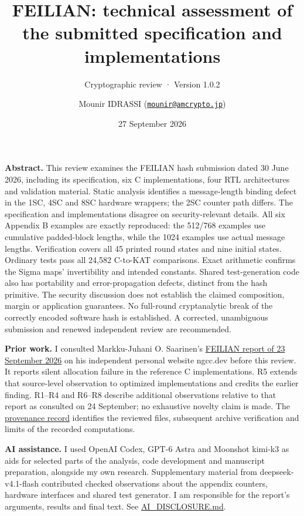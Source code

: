 \documentclass[
  english,
  11pt,
  a4paper,
]{article}
\title{FEILIAN: technical assessment of the submitted specification and
implementations}
\subtitle{Cryptographic review · Version 1.0.2}
\author{Mounir IDRASSI
(\href{mailto:mounir@amcrypto.jp}{\nolinkurl{mounir@amcrypto.jp}})}
\date{27 September 2026}
\begin{document}
\maketitle

\textbf{Abstract.} This review examines the FEILIAN hash submission
dated 30 June 2026, including its specification, six C implementations,
four RTL architectures and validation material. Static analysis
identifies a message-length binding defect in the 1SC, 4SC and 8SC
hardware wrappers; the 2SC counter path differs. The specification and
implementations disagree on security-relevant details. All six Appendix
B examples are exactly reproduced: the 512/768 examples use cumulative
padded-block lengths, while the 1024 examples use actual message
lengths. Verification covers all 45 printed round states and nine
initial states. Ordinary tests pass all 24,582 C-to-KAT comparisons.
Exact arithmetic confirms the Sigma maps' invertibility and intended
constants. Shared test-generation code also has portability and
error-propagation defects, distinct from the hash primitive. The
security discussion does not establish the claimed composition, margin
or application guarantees. No full-round cryptanalytic break of the
correctly encoded software hash is established. A corrected, unambiguous
submission and renewed independent review are recommended.

\textbf{Prior work.} I consulted Markku-Juhani O. Saarinen's
\href{https://ngcc.dev/reports/hash-10.html}{FEILIAN report of 23
September 2026} on his independent personal website ngcc.dev before this
review. It reports silent allocation failure in the reference C
implementations. R5 extends that source-level observation to optimized
implementations and credits the earlier finding. R1--R4 and R6--R8
describe additional observations relative to that report as consulted on
24 September; no exhaustive novelty claim is made. The
\href{PROVENANCE.md}{provenance record} identifies the reviewed files,
subsequent archive verification and limits of the recorded computations.

\textbf{AI assistance.} I used OpenAI Codex, GPT-6 Astra and Moonshot
kimi-k3 as aids for selected parts of the analysis, code development and
manuscript preparation, alongside my own research. Supplementary
material from deepseek-v4.1-flash contributed checked observations about
the appendix counters, hardware interfaces and shared test generator. I
am responsible for the report's arguments, results and final text. See
\url{AI_DISCLOSURE.md}.
\end{document}
